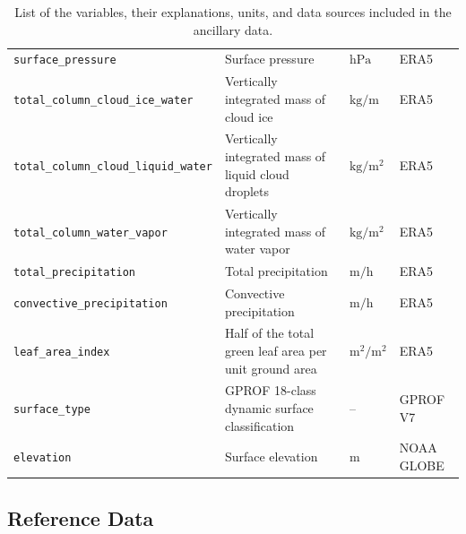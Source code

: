 \documentclass[11pt]{article}
\begin{document}
\begin{table}[htbp]
\begin{tabular}{lp{4cm}ll}
		\texttt{surface\_pressure}                   & Surface pressure                                       & $\si{\hecto \pascal}$                       & ERA5            \\
		\texttt{total\_column\_cloud\_ice\_water}    & Vertically integrated mass of cloud ice                & $\si{\kilo \gram \per \meter}$              & ERA5            \\
		\texttt{total\_column\_cloud\_liquid\_water} & Vertically integrated mass of liquid cloud droplets    & $\si{\kilo \gram \per \meter \squared}$     & ERA5            \\
		\texttt{total\_column\_water\_vapor}         & Vertically integrated mass of water vapor              & $\si{\kilo \gram \per \meter \squared}$     & ERA5            \\
		\texttt{total\_precipitation}                & Total precipitation                                    & $\si{\meter \per \hour}$                    & ERA5            \\
		\texttt{convective\_precipitation}           & Convective precipitation                               & $\si{\meter \per \hour}$                    & ERA5            \\
		\texttt{leaf\_area\_index}                   & Half of the total green leaf area per unit ground area & $\si{\meter \squared \per \meter \squared}$ & ERA5            \\
		\texttt{surface\_type}                       & GPROF 18-class dynamic surface classification          & --                                          & GPROF V7        \\
		\texttt{elevation}                           & Surface elevation                                      & $\si{\meter}$                               & NOAA GLOBE      \\
		\bottomrule
	\end{tabular}
	\caption{List of the variables, their explanations, units, and data sources included in the ancillary data.}
	\label{tab:ancillary}
\end{table}


\subsection{Reference Data}
\end{document}
